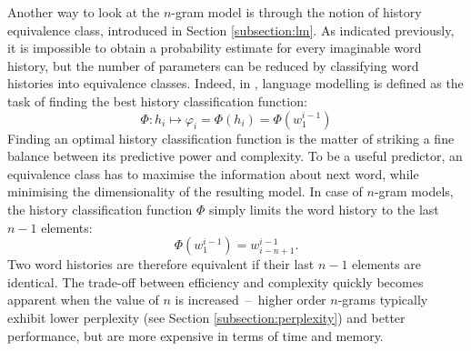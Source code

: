 Another way to look at the \mbox{$n$-gram} model is through the notion of history equivalence class, introduced in Section \ref{subsection:lm}. As indicated previously, it is impossible to obtain a probability estimate for every imaginable word history, but the number of parameters can be reduced by classifying word histories into equivalence classes. Indeed, in \cite{jelinek1997statistical}, language modelling is defined as the task of finding the best history classification function:
\begin{equation}
	\Phi:h_{i}\mapsto\varphi_{i}=\Phi(h_{i})=\Phi(w_{1}^{i-1})
\end{equation}
Finding an optimal history classification function is the matter of striking a fine balance between its predictive power and complexity. To be a useful predictor, an equivalence class has to maximise the information about next word, while minimising the dimensionality of the resulting model. In case of \mbox{$n$-gram} models, the history classification function $\Phi$ simply limits the word history to the last $n-1$ elements:
\begin{equation}
	\Phi(w_{1}^{i-1})=w_{i-n+1}^{i-1}.
\end{equation}
Two word histories are therefore equivalent if their last $n-1$ elements are identical. The trade-off between efficiency and complexity quickly becomes apparent when the value of $n$ is \mbox{increased~--~higher} order \mbox{$n$-grams} typically exhibit lower perplexity (see Section \ref{subsection:perplexity}) and better performance, but are more expensive in terms of time and memory.
